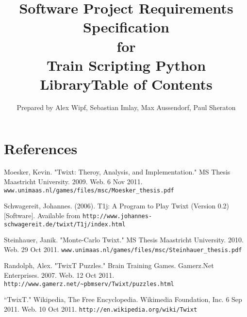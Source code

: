\documentclass[a4paper,11pt,notitlepage]{article}
\title{{\bf Software Project Requirements Specification} \\ for \\ {\bf Train Scripting Python Library}}
\author{Prepared by Alex Wipf, Sebastian Imlay, Max Aussendorf, Paul Sheraton}
\begin{document}
\maketitle
\pagebreak
\title{Table of Contents}
\tableofcontents

\addtocounter{page}{-1}
\clearpage

\newpage
\section*{References}
\begin{hangparas}{.25in}{1}
Moesker, Kevin. "Twixt: Theroy, Analysis, and Implementation." MS Thesis Maastricht University. 2009. Web. 6 Nov 2011. \verb=www.unimaas.nl/games/files/msc/Moesker_thesis.pdf=

\vspace{5mm}
Schwagereit, Johannes. (2006). T1j: A Program to Play Twixt (Version 0.2) [Software]. Available from \verb=http://www.johannes-schwagereit.de/twixt/T1j/index.html=

\vspace{5mm}
Steinhauer, Janik. "Monte-Carlo Twixt." MS Thesis Maastricht University. 2010. Web. 29 Oct 2011. \verb=www.unimaas.nl/games/files/msc/Steinhauer_thesis.pdf=

\vspace{5mm}
Randolph, Alex. "TwixT Puzzles." Brain Training Games. Gamerz.Net Enterprises. 2007. Web. 12 Oct 2011. \verb=http://www.gamerz.net/~pbmserv/Twixt/puzzles.html=

\vspace{5mm}
``TwixT." Wikipedia, The Free Encyclopedia. Wikimedia Foundation, Inc. 6 Sep 2011. Web. 10 Oct 2011. \verb=http://en.wikipedia.org/wiki/Twixt=

\end{hangparas}
\end{document}
